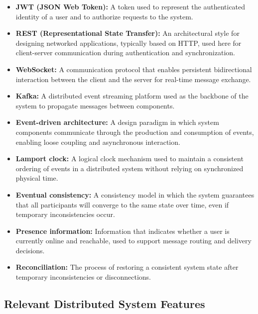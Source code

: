 \documentclass{scrartcl}
\begin{document}
\begin{itemize}
	\item \textbf{JWT (JSON Web Token):} A token used to represent the authenticated identity of a user and to authorize requests to the system.
	\item \textbf{REST (Representational State Transfer):} An architectural style for designing networked applications, typically based on HTTP, used here for client-server communication during authentication and synchronization.
	\item \textbf{WebSocket:} A communication protocol that enables persistent bidirectional interaction between the client and the server for real-time message exchange.
	\item \textbf{Kafka:} A distributed event streaming platform used as the backbone of the system to propagate messages between components.
	\item \textbf{Event-driven architecture:} A design paradigm in which system components communicate through the production and consumption of events, enabling loose coupling and asynchronous interaction.
	\item \textbf{Lamport clock:} A logical clock mechanism used to maintain a consistent ordering of events in a distributed system without relying on synchronized physical time.
	\item \textbf{Eventual consistency:} A consistency model in which the system guarantees that all participants will converge to the same state over time, even if temporary inconsistencies occur.
	\item \textbf{Presence information:} Information that indicates whether a user is currently online and reachable, used to support message routing and delivery decisions.
	\item \textbf{Reconciliation:} The process of restoring a consistent system state after temporary inconsistencies or disconnections.
\end{itemize}

\subsection{Relevant Distributed System Features}
\label{ds-features}
\end{document}
